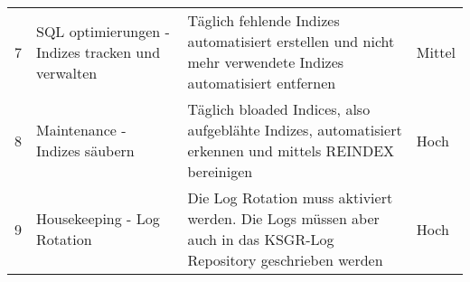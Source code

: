 \begin{landscape}
\begin{table}[H]
{\begin{tabular}{@{}llll@{}}
7            & SQL optimierungen - Indizes tracken und verwalten & Täglich fehlende Indizes automatisiert erstellen und nicht mehr verwendete Indizes automatisiert entfernen                                                                                                                                                                                                                                                                                                                                                                                                                                                                                                                                                                                                                                                                                                                                                                           & Mittel             \\
8            & Maintenance - Indizes säubern                     & Täglich bloaded Indices, also aufgeblähte Indizes, automatisiert erkennen und mittels REINDEX bereinigen                                                                                                                                                                                                                                                                                                                                                                                                                                                                                                                                                                                                                                                                                                                                                                             & Hoch               \\
9            & Housekeeping - Log Rotation                       & Die Log Rotation muss aktiviert werden. Die Logs müssen aber auch in das KSGR-Log Repository geschrieben werden                                                                                                                                                                                                                                                                                                                                                                                                                                                                                                                                                                                                                                                                                                                                                                      & Hoch               \\

\end{tabular}}
\end{table}
\end{landscape}
